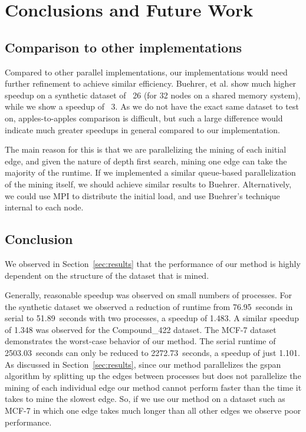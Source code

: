 \section{Conclusions and Future Work}
\label{sec:conclusions}

\subsection{Comparison to other implementations}
\label{subsec:comparison}

Compared to other parallel implementations, our implementations would need
further refinement to achieve similar efficiency.  Buehrer, et al. show
much higher speedup on a synthetic dataset of ~26 (for 32 nodes on a shared
memory system), while we show a speedup of ~3.  As we do not have the exact
same dataset to test on, apples-to-apples comparison is difficult, but such a
large difference would indicate much greater speedups in general compared to
our implementation.   

The main reason for this is that we are parallelizing the mining of each 
initial edge, and given the nature of depth first search, mining one edge 
can take the majority of the runtime.  If we implemented a similar 
queue-based parallelization of the mining itself, we should achieve similar 
results to Buehrer.  Alternatively, we could use MPI to distribute the 
initial load, and use Buehrer's technique internal to each node.  

\subsection{Conclusion}
\label{subsec:conclusions}

We observed in Section~\ref{sec:results} that the performance of our method
is highly dependent on the structure of the dataset that is mined.

Generally, reasonable speedup was observed on small numbers of processes. For
the synthetic dataset we observed a reduction of runtime from 76.95~seconds
in serial to 51.89~seconds with two processes, a speedup of 1.483. A similar
speedup of 1.348 was observed for the Compound\_422 dataset. The MCF-7 dataset
demonstrates the worst-case behavior of our method. The serial runtime of
2503.03~seconds can only be reduced to 2272.73~seconds, a speedup of just
1.101. As discussed in Section~\ref{sec:results}, since our method
parallelizes the gspan algorithm by splitting up the edges between processes
but does not parallelize the mining of each individual edge our method cannot
perform faster than the time it takes to mine the slowest edge. So, if we
use our method on a dataset such as MCF-7 in which one edge takes much longer
than all other edges we observe poor performance.

